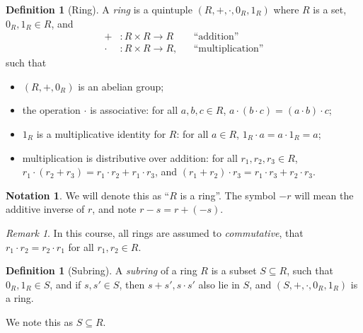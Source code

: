 \documentclass{article}
\theoremstyle{definition}
\newtheorem{definition}[theorem]{Definition}
\newtheorem{notation}[theorem]{Notation}
\theoremstyle{remark}
\newtheorem{remark}[theorem]{Remark}
\newcommand{\pqty}[1]{\left(#1\right)}
\newcommand{\functiondomain}[3]{#1:#2\to #3}
\newcommand{\subring}{\subseteq}
\begin{document}
\begin{definition}[Ring]
    \label{def:ring}%
    A \emph{ring} is a quintuple \(\pqty{R, +, \cdot, 0_R, 1_R}\) where \(R\) is a set, \(0_R, 1_R \in R\), and
    \begin{align*}
        \functiondomain{+&}{R \times R}{R} && \text{``addition''} \\
        \functiondomain{\cdot&}{R \times R}{R}, && \text{``multiplication''}
    \end{align*}
    such that
    \begin{itemize}
        \item \(\pqty{R, +, 0_R}\) is an abelian group;
        \item the operation \(\cdot\) is associative: for all \(a, b, c \in R\), \(a \cdot \pqty{b \cdot c} = \pqty{a \cdot b} \cdot c\);
        \item \(1_R\) is a multiplicative identity for \(R\): for all \(a \in R\), \(1_R \cdot a = a \cdot 1_R = a\);
        \item multiplication is distributive over addition: for all \(r_1, r_2, r_3 \in R\), \(r_1 \cdot \pqty{r_2 + r_3} = r_1 \cdot r_2 + r_1 \cdot r_3\), and \(\pqty{r_1 + r_2} \cdot r_3 = r_1 \cdot r_3 + r_2 \cdot r_3\).
    \end{itemize}
\end{definition}

\begin{notation}
    We will denote this as ``\(R\) is a ring''. The symbol \(-r\) will mean the additive inverse of \(r\), and note \(r - s = r + \pqty{-s}\).
\end{notation}

\begin{remark}
    In this course, all rings are assumed to \emph{commutative}, that \(r_1 \cdot r_2 = r_2 \cdot r_1\) for all \(r_1, r_2 \in R\).
\end{remark}

\begin{definition}[Subring]
    \label{def:subring}%
    A \emph{subring} of a ring \(R\) is a subset \(S \subseteq R\), such that \(0_R, 1_R \in S\), and if \(s, s' \in S\), then \(s + s', s \cdot s'\) also lie in \(S\), and \(\pqty{S, +, \cdot, 0_R, 1_R}\) is a ring.

    We note this as \(S \subring R\).
\end{definition}
\end{document}
